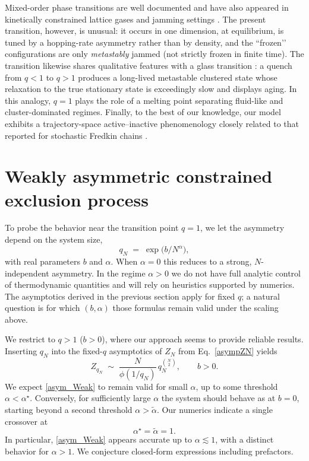 \documentclass[pdflatex,sn-mathphys-num]{sn-jnl}
\theoremstyle{definition}
\theoremstyle{remark}
\numberwithin{equation}{section}
\begin{document}
Mixed-order phase transitions are well documented \cite{bar2014mixed,korbel2025microscopic} and have also appeared in kinetically constrained lattice gases and jamming settings \cite{toninelli2006jamming,toninelli2007jamming,gross1985mean,schwarz2006onset}. The present transition, however, is unusual: it occurs in one dimension, at equilibrium, is tuned by a hopping-rate asymmetry rather than by density, and the “frozen’’ configurations are only {\it metastably} jammed (not strictly frozen in finite time). The transition likewise shares qualitative features with a glass transition \cite{ritort2003glassy}: a quench from \(q<1\) to \(q>1\) produces a long-lived metastable clustered state whose relaxation to the true stationary state is exceedingly slow and displays aging. In this analogy, \(q=1\) plays the role of a melting point separating fluid-like and cluster-dominated regimes. Finally, to the best of our knowledge, our model exhibits a trajectory-space active–inactive phenomenology closely related to that reported for stochastic Fredkin chains \cite{causer2022slow}.
\section{Weakly asymmetric constrained exclusion process}
\label{sec:weakly}
To probe the behavior near the transition point $q=1$, we let the asymmetry depend on the system size,
\begin{equation}
    q_N \;=\; \exp\!\bigl(b/N^{\alpha}\bigr),
\end{equation}
with real parameters $b$ and $\alpha$. When $\alpha=0$ this reduces to a strong, $N$-independent asymmetry. In the regime $\alpha>0$ we do not have full analytic control of thermodynamic quantities and will rely on heuristics supported by numerics. The asymptotics derived in the previous section apply for fixed $q$; a natural question is for which $(b,\alpha)$ those formulas remain valid under the scaling above.

We restrict to $q>1$ ($b>0$), where our approach seems to provide reliable results. Inserting $q_N$ into the fixed-$q$ asymptotics of $Z_N$ from Eq.~\eqref{asympZN} yields
\begin{equation}
    Z_{q_N}\;\sim\; \frac{N}{\phi(1/q_N)}\, q_N^{\binom{N}{2}}, 
    \qquad b>0.
    \label{asym_Weak}
\end{equation}
We expect \eqref{asym_Weak} to remain valid for small $\alpha$, up to some threshold $\alpha<\alpha^\star$. Conversely, for sufficiently large $\alpha$ the system should behave as at $b=0$, starting beyond a second threshold $\alpha>\tilde\alpha$. Our numerics indicate a single crossover at
\[
    \alpha^\star=\tilde\alpha=1.
\]
In particular, \eqref{asym_Weak} appears accurate up to $\alpha\lesssim 1$, with a distinct behavior for $\alpha>1$. We conjecture closed-form expressions including prefactors.
\end{document}
